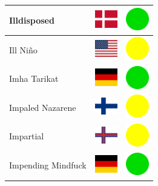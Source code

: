 \documentclass[12pt, a4paper, twoside]{report}
\begin{document}
\begin{center}
\begin{longtable}{|p{5cm}|p{2cm}|p{2cm}|}
Illdisposed & \includegraphics[width=1cm]{4x3/dk} & \includegraphics[width=1cm]{likes/y} \\ \hline
Ill Niño & \includegraphics[width=1cm]{4x3/us} & \includegraphics[width=1cm]{likes/m} \\ \hline
Imha Tarikat & \includegraphics[width=1cm]{4x3/de} & \includegraphics[width=1cm]{likes/y} \\ \hline
Impaled Nazarene & \includegraphics[width=1cm]{4x3/fi} & \includegraphics[width=1cm]{likes/m} \\ \hline
Impartial & \includegraphics[width=1cm]{4x3/fo} & \includegraphics[width=1cm]{likes/m} \\ \hline
Impending Mindfuck & \includegraphics[width=1cm]{4x3/de} & \includegraphics[width=1cm]{likes/y} \\ \hline

\end{longtable}
\end{center}
\end{document}
